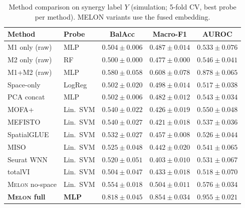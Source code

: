 \documentclass{article}
\theoremstyle{plain}
\theoremstyle{definition}
\newcommand{\melon}{\textsc{Melon}}
\begin{document}
\begin{table}[!htbp]
\centering
\caption{Method comparison on synergy label $Y$ (simulation; 5-fold CV, best probe per method). MELON variants use the fused embedding.}
\label{tab:sim-phase2}
\small
\begin{tabular}{llccc}
\toprule
Method & Probe & BalAcc & Macro-F1 & AUROC \\
\midrule
M1 only (raw)             & MLP       & $0.504 \pm 0.006$ & $0.487 \pm 0.014$ & $0.533 \pm 0.076$ \\
M2 only (raw)             & RF        & $0.500 \pm 0.000$ & $0.477 \pm 0.000$ & $0.546 \pm 0.041$ \\
M1+M2 (raw)               & MLP       & $0.580 \pm 0.058$ & $0.608 \pm 0.078$ & $0.878 \pm 0.065$ \\
Space-only                & LogReg    & $0.502 \pm 0.020$ & $0.498 \pm 0.014$ & $0.517 \pm 0.038$ \\
PCA concat                & MLP       & $0.502 \pm 0.006$ & $0.482 \pm 0.012$ & $0.543 \pm 0.034$ \\
\midrule
MOFA+                     & Lin.\ SVM & $0.540 \pm 0.022$ & $0.426 \pm 0.019$ & $0.550 \pm 0.048$ \\
MEFISTO                   & Lin.\ SVM & $0.540 \pm 0.027$ & $0.421 \pm 0.018$ & $0.537 \pm 0.036$ \\
SpatialGLUE               & Lin.\ SVM & $0.532 \pm 0.027$ & $0.457 \pm 0.008$ & $0.526 \pm 0.044$ \\
MISO                      & Lin.\ SVM & $0.525 \pm 0.048$ & $0.442 \pm 0.020$ & $0.541 \pm 0.065$ \\
Seurat WNN                & Lin.\ SVM & $0.520 \pm 0.051$ & $0.403 \pm 0.010$ & $0.531 \pm 0.067$ \\
totalVI                   & Lin.\ SVM & $0.504 \pm 0.047$ & $0.433 \pm 0.018$ & $0.518 \pm 0.070$ \\
\midrule
\melon{} no-space          & Lin.\ SVM & $0.554 \pm 0.018$ & $0.504 \pm 0.011$ & $0.576 \pm 0.034$ \\
\textbf{\melon{} full}     & \textbf{MLP} & $\mathbf{0.818 \pm 0.045}$ & $\mathbf{0.854 \pm 0.034}$ & $\mathbf{0.955 \pm 0.021}$ \\
\bottomrule
\end{tabular}
\end{table}
\end{document}
